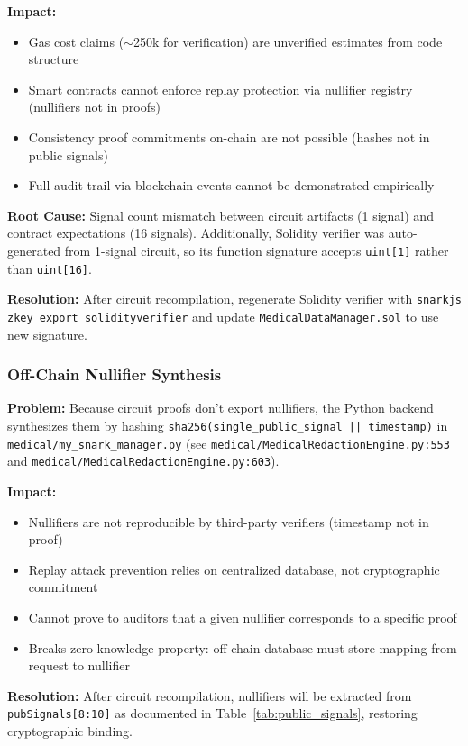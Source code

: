 \textbf{Impact:}
\begin{itemize}
    \item Gas cost claims ($\sim$250k for verification) are unverified estimates from code structure
    \item Smart contracts cannot enforce replay protection via nullifier registry (nullifiers not in proofs)
    \item Consistency proof commitments on-chain are not possible (hashes not in public signals)
    \item Full audit trail via blockchain events cannot be demonstrated empirically
\end{itemize}

\textbf{Root Cause:} Signal count mismatch between circuit artifacts (1 signal) and contract expectations (16 signals). Additionally, Solidity verifier was auto-generated from 1-signal circuit, so its function signature accepts \texttt{uint[1]} rather than \texttt{uint[16]}.

\textbf{Resolution:} After circuit recompilation, regenerate Solidity verifier with \texttt{snarkjs zkey export solidityverifier} and update \texttt{MedicalDataManager.sol} to use new signature.

\subsubsection{Off-Chain Nullifier Synthesis}

\textbf{Problem:} Because circuit proofs don't export nullifiers, the Python backend synthesizes them by hashing \texttt{sha256(single\_public\_signal || timestamp)} in \texttt{medical/my\_snark\_manager.py} (see \texttt{medical/MedicalRedactionEngine.py:553} and \texttt{medical/MedicalRedactionEngine.py:603}).

\textbf{Impact:}
\begin{itemize}
    \item Nullifiers are not reproducible by third-party verifiers (timestamp not in proof)
    \item Replay attack prevention relies on centralized database, not cryptographic commitment
    \item Cannot prove to auditors that a given nullifier corresponds to a specific proof
    \item Breaks zero-knowledge property: off-chain database must store mapping from request to nullifier
\end{itemize}

\textbf{Resolution:} After circuit recompilation, nullifiers will be extracted from \texttt{pubSignals[8:10]} as documented in Table~\ref{tab:public_signals}, restoring cryptographic binding.

